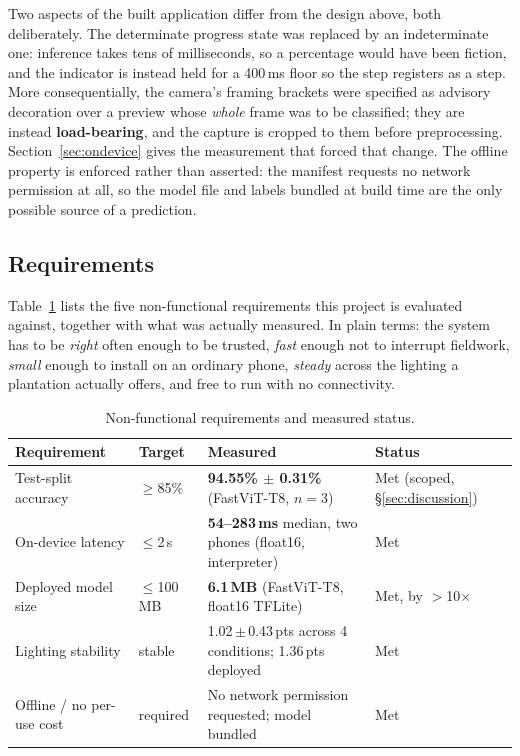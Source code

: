 \documentclass{article}
\begin{document}
Two aspects of the built application differ from the design above, both deliberately. The determinate
progress state was replaced by an indeterminate one: inference takes tens of milliseconds, so a percentage
would have been fiction, and the indicator is instead held for a 400\,ms floor so the step registers as a
step. More consequentially, the camera's framing brackets were specified as advisory decoration over a
preview whose \textit{whole} frame was to be classified; they are instead \textbf{load-bearing}, and the
capture is cropped to them before preprocessing. Section~\ref{sec:ondevice} gives the measurement that
forced that change. The offline property is enforced rather than asserted: the manifest requests no
network permission at all, so the model file and labels bundled at build time are the only possible
source of a prediction.

\subsection{Requirements}

Table~\ref{tab:nfr} lists the five non-functional requirements this project is evaluated against, together
with what was actually measured. In plain terms: the system has to be \textit{right} often enough to be
trusted, \textit{fast} enough not to interrupt fieldwork, \textit{small} enough to install on an ordinary
phone, \textit{steady} across the lighting a plantation actually offers, and free to run with no
connectivity.

\begin{table}[t]
\centering
\caption{Non-functional requirements and measured status.}
\label{tab:nfr}
\begin{tabular}{@{}llll@{}}
\toprule
Requirement & Target & Measured & Status \\
\midrule
Test-split accuracy & $\geq$85\% & \textbf{94.55\% $\pm$ 0.31\%} (FastViT-T8, $n{=}3$) & Met (scoped, \S\ref{sec:discussion}) \\
On-device latency & $\leq$2\,s & \textbf{54--283\,ms} median, two phones (float16, interpreter) & Met \\
Deployed model size & $\leq$100\,MB & \textbf{6.1\,MB} (FastViT-T8, float16 TFLite) & Met, by $>$10$\times$ \\
Lighting stability & stable & 1.02\,$\pm$\,0.43\,pts across 4 conditions; 1.36\,pts deployed & Met \\
Offline / no per-use cost & required & No network permission requested; model bundled & Met \\
\bottomrule
\end{tabular}
\end{table}
\end{document}
